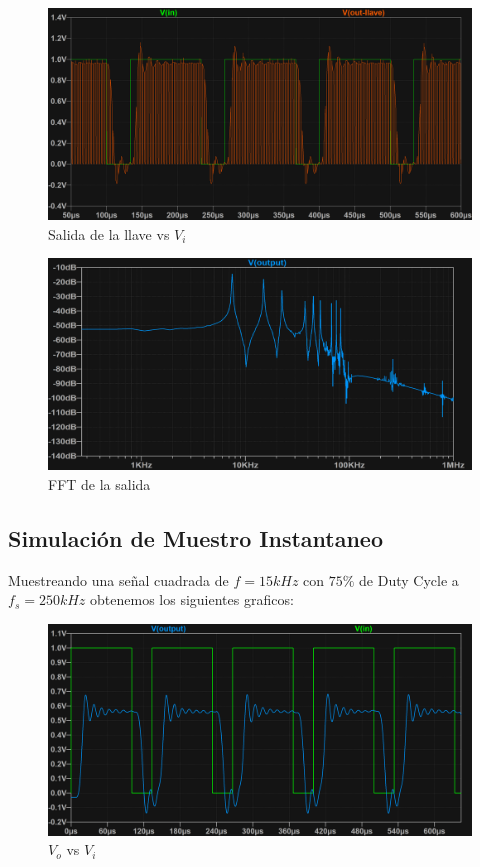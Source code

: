 \begin{figure}[H]
    \centering
    \includegraphics[width=0.8\linewidth]{Imagenes Nacho/Natural/Natural-Vi-Sqr15k-out-LLave.png}
    \caption{Salida de la llave vs $V_i$}
    \label{fig:out-LLave}
\end{figure}

\begin{figure}[H]
    \centering
    \includegraphics[width=0.8\linewidth]{Imagenes Nacho/Natural/Natural-Vi-Sqr15k-outFFT.png}
    \caption{FFT de la salida}
    \label{fig:FFT de la salida}
\end{figure}


\subsection{Simulaci\'on de Muestro Instantaneo}
Muestreando una señal cuadrada de $f = 15kHz$ con $75\%$ de Duty Cycle a $f_s = 250kHz$ obtenemos los siguientes graficos:

\begin{figure}[H]
    \centering
    \includegraphics[width=0.8\linewidth]{Imagenes Nacho/Instantaneo/Vi-Vo.png}
    \caption{$V_o$ vs $V_i$}
    \label{fig:Vi-Vo}
\end{figure}

